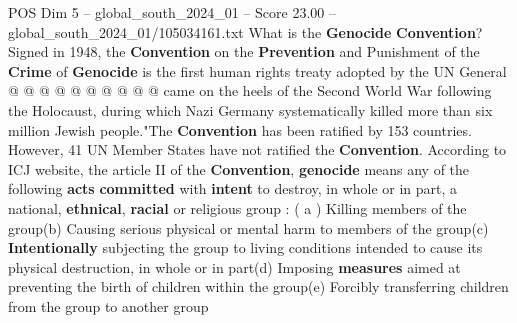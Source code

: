 \begin{textsample}{POS Dim 5 – global\_south\_2024\_01 – Score 23.00 – global\_south\_2024\_01/105034161.txt}
What is the \textbf{Genocide} \textbf{Convention}?
Signed in 1948, the \textbf{Convention} on the \textbf{Prevention} and Punishment of the \textbf{Crime} of \textbf{Genocide} is the first human rights treaty adopted by the UN General @ @ @ @ @ @ @ @ @ @ came on the heels of the Second World War following the Holocaust, during which Nazi Germany systematically killed more than six million Jewish people."The \textbf{Convention} has been ratified by 153 countries.
However, 41 UN Member States have not ratified the \textbf{Convention}.
According to ICJ website, the article II of the \textbf{Convention}, \textbf{genocide} means any of the following \textbf{acts} \textbf{committed} with \textbf{intent} to destroy, in whole or in part, a national, \textbf{ethnical}, \textbf{racial} or religious group : ( a ) Killing members of the group(b) Causing serious physical or mental harm to members of the group(c) \textbf{Intentionally} subjecting the group to living conditions intended to cause its physical destruction, in whole or in part(d) Imposing \textbf{measures} aimed at preventing the birth of children within the group(e) Forcibly transferring children from the group to another group

\end{textsample}
